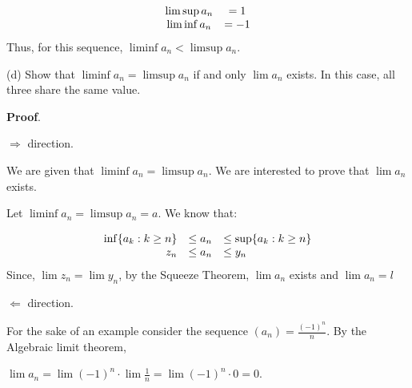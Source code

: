 \documentclass[10pt]{article}
\begin{document}
\begin{equation*}
\begin{array}{ c c }
\limsup a_{n} & =1\\
\liminf a_{n} & =-1
\end{array}
\end{equation*}
Thus, for this sequence, $\displaystyle \liminf a_{n} < \limsup a_{n}$.



(d) Show that $\displaystyle \liminf a_{n} =\limsup a_{n}$ if and only $\displaystyle \lim a_{n}$ exists. In this case, all three share the same value.



\textbf{Proof}.

$\displaystyle \Longrightarrow $ direction.



We are given that $\displaystyle \liminf a_{n} =\limsup a_{n}$. We are interested to prove that $\displaystyle \lim a_{n}$ exists. 



Let $\displaystyle \liminf a_{n} =\limsup a_{n} =a$. We know that:


\begin{equation*}
\begin{array}{ r c l }
\inf\{a_{k} :k\geq n\} & \leq a_{n} & \leq \sup \{a_{k} :k\geq n\}\\
z_{n} & \leq a_{n} & \leq y_{n}
\end{array}
\end{equation*}
Since, $\displaystyle \lim z_{n} =\lim y_{n}$, by the Squeeze Theorem, $\displaystyle \lim a_{n}$ exists and $\displaystyle \lim a_{n} =l$



$\displaystyle \Longleftarrow $ direction.



For the sake of an example consider the sequence $\displaystyle ( a_{n}) =\frac{( -1)^{n}}{n}$. By the Algebraic limit theorem,

$\displaystyle \lim a_{n} =\lim ( -1)^{n} \cdot \lim \frac{1}{n} =\lim ( -1)^{n} \cdot 0=0$.



\begin{tikzpicture}[x=0.75pt,y=0.75pt,yscale=-1,xscale=1]





\end{tikzpicture}
\end{document}
